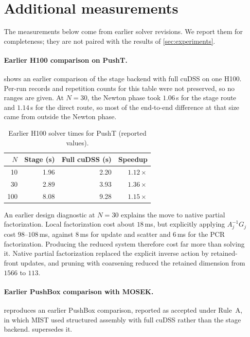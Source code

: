 \section{Additional measurements}\label{app:measurements}

The measurements below come from earlier solver revisions. We report them for
completeness; they are not paired with the results of \cref{sec:experiments}.

\paragraph{Earlier H100 comparison on PushT.}
 shows an earlier comparison of the stage backend with full cuDSS
on one H100. Per-run records and repetition counts for this table were not
preserved, so no ranges are given. At $N=30$, the Newton phase took $1.06$\,s
for the stage route and $1.14$\,s for the direct route, so most of the
end-to-end difference at that size came from outside the Newton phase.

\begin{table}[htbp]
\centering
\caption{Earlier H100 solver times for PushT (reported values).}
\label{tab:h100}
\small
\begin{tabular}{@{}rrrr@{}}
\toprule
$N$ & Stage (s) & Full cuDSS (s) & Speedup\\
\midrule
10 & 1.96 & 2.20 & $1.12\times$\\
30 & 2.89 & 3.93 & $1.36\times$\\
100 & 8.08 & 9.28 & $1.15\times$\\
\bottomrule
\end{tabular}
\end{table}

An earlier design diagnostic at $N=30$ explains the move to native partial
factorization. Local factorization cost about $18$\,ms, but explicitly applying
$A_j^{-1}G_j$ cost $98$--$108$\,ms, against $8$\,ms for update and scatter and
$6$\,ms for the PCR factorization. Producing the reduced system therefore cost far
more than solving it. Native partial factorization replaced the explicit inverse
action by retained-front updates, and pruning with coarsening reduced the
retained dimension from $1566$ to $113$.

\paragraph{Earlier PushBox comparison with MOSEK.}
 reproduces an earlier PushBox comparison, reported as accepted under Rule~A, in
which MIST used structured assembly with full cuDSS rather than the stage
backend.  supersedes it.

